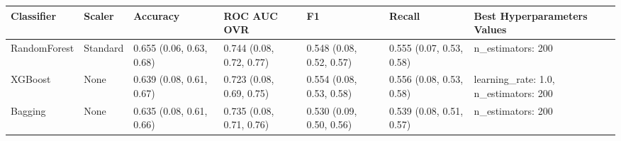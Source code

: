 \begin{tabular}{lllllll}
\toprule
Classifier & Scaler & Accuracy & ROC AUC OVR & F1 & Recall & Best Hyperparameters Values \\
\midrule
RandomForest & Standard & 0.655 (0.06, 0.63, 0.68) & 0.744 (0.08, 0.72, 0.77) & 0.548 (0.08, 0.52, 0.57) & 0.555 (0.07, 0.53, 0.58) & {{n\_estimators: 200}} \\
XGBoost & None & 0.639 (0.08, 0.61, 0.67) & 0.723 (0.08, 0.69, 0.75) & 0.554 (0.08, 0.53, 0.58) & 0.556 (0.08, 0.53, 0.58) & {{learning\_rate: 1.0, n\_estimators: 200}} \\
Bagging & None & 0.635 (0.08, 0.61, 0.66) & 0.735 (0.08, 0.71, 0.76) & 0.530 (0.09, 0.50, 0.56) & 0.539 (0.08, 0.51, 0.57) & {{n\_estimators: 200}} \\
\bottomrule
\end{tabular}
